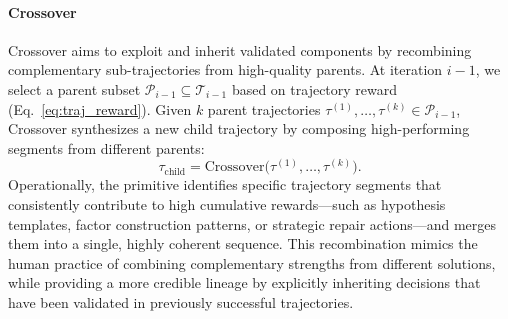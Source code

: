 \paragraph{Crossover}
Crossover aims to exploit and inherit validated components by recombining complementary sub-trajectories from high-quality parents. At iteration $i-1$, we select a parent subset $\mathcal{P}_{i-1}\subseteq \mathcal{T}_{i-1}$ based on trajectory reward (Eq.~\ref{eq:traj_reward}). Given $k$ parent trajectories $\tau^{(1)},\ldots,\tau^{(k)}\in\mathcal{P}_{i-1}$, Crossover synthesizes a new child trajectory by composing high-performing segments from different parents:
\begin{equation}
\tau_{\mathrm{child}} = \mathrm{Crossover}\big(\tau^{(1)},\ldots,\tau^{(k)}\big).
\label{eq:crossover}
\end{equation}
Operationally, the primitive identifies specific trajectory segments that consistently contribute to high cumulative rewards—such as hypothesis templates, factor construction patterns, or strategic repair actions—and merges them into a single, highly coherent sequence.
This recombination mimics the human practice of combining complementary strengths from different solutions, while providing a more credible lineage by explicitly inheriting decisions that have been validated in previously successful trajectories.

